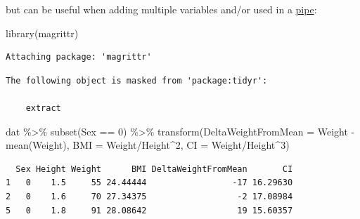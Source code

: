 \documentclass[
]{book}
\newenvironment{Shaded}{\begin{snugshade}}{\end{snugshade}}
\newcommand{\AttributeTok}[1]{\textcolor[rgb]{0.77,0.63,0.00}{#1}}
\newcommand{\DecValTok}[1]{\textcolor[rgb]{0.00,0.00,0.81}{#1}}
\newcommand{\FunctionTok}[1]{\textcolor[rgb]{0.00,0.00,0.00}{#1}}
\newcommand{\NormalTok}[1]{#1}
\newcommand{\OtherTok}[1]{\textcolor[rgb]{0.56,0.35,0.01}{#1}}
\newcommand{\SpecialCharTok}[1]{\textcolor[rgb]{0.00,0.00,0.00}{#1}}
\begin{document}
\begin{Shaded}
\end{Shaded}

but can be useful when adding multiple variables and/or used in a \protect\hyperlink{pipe}{pipe}:

\begin{Shaded}
\begin{Highlighting}[]
\FunctionTok{library}\NormalTok{(magrittr)}
\end{Highlighting}
\end{Shaded}

\begin{verbatim}
Attaching package: 'magrittr'
\end{verbatim}

\begin{verbatim}
The following object is masked from 'package:tidyr':

    extract
\end{verbatim}

\begin{Shaded}
\begin{Highlighting}[]
\NormalTok{dat }\SpecialCharTok{\%\textgreater{}\%} 
  \FunctionTok{subset}\NormalTok{(Sex }\SpecialCharTok{==} \DecValTok{0}\NormalTok{) }\SpecialCharTok{\%\textgreater{}\%}
  \FunctionTok{transform}\NormalTok{(}\AttributeTok{DeltaWeightFromMean =}\NormalTok{ Weight }\SpecialCharTok{{-}} \FunctionTok{mean}\NormalTok{(Weight),}
            \AttributeTok{BMI =}\NormalTok{ Weight}\SpecialCharTok{/}\NormalTok{Height}\SpecialCharTok{\^{}}\DecValTok{2}\NormalTok{,}
            \AttributeTok{CI =}\NormalTok{ Weight}\SpecialCharTok{/}\NormalTok{Height}\SpecialCharTok{\^{}}\DecValTok{3}\NormalTok{)}
\end{Highlighting}
\end{Shaded}

\begin{verbatim}
  Sex Height Weight      BMI DeltaWeightFromMean       CI
1   0    1.5     55 24.44444                 -17 16.29630
2   0    1.6     70 27.34375                  -2 17.08984
5   0    1.8     91 28.08642                  19 15.60357
\end{verbatim}
\end{document}
